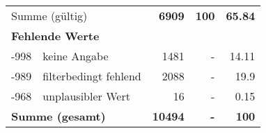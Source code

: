 \begin{longtable}{lXrrr}
     \midrule
     \multicolumn{2}{l}{Summe (gültig)} &
       \textbf{\num{6909}} &
     \textbf{\num{100}} &
       \textbf{\num[round-mode=places,round-precision=2]{65.84}} \\
     \multicolumn{5}{l}{\textbf{Fehlende Werte}}\\
       -998 &
       keine Angabe &
         \num{1481} &
        - &
         \num[round-mode=places,round-precision=2]{14.11} \\
       -989 &
       filterbedingt fehlend &
         \num{2088} &
        - &
         \num[round-mode=places,round-precision=2]{19.9} \\
       -968 &
       unplausibler Wert &
         \num{16} &
        - &
         \num[round-mode=places,round-precision=2]{0.15} \\
     \midrule
     \multicolumn{2}{l}{\textbf{Summe (gesamt)}} &
          \textbf{\num{10494}} &
        \textbf{-} &
        \textbf{\num{100}} \\
     \bottomrule
     \end{longtable}
     
